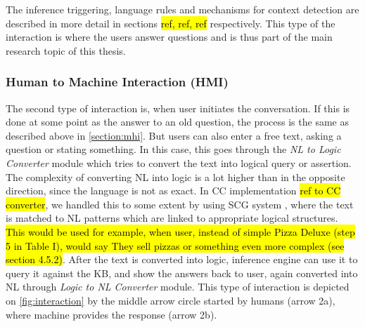 The inference triggering, language rules and mechanisms for context detection
are described in more detail in sections \hl{ref, ref, ref} respectively. This
type of the interaction is where the users answer questions and is thus part of
the main research topic of this thesis.

\subsubsection{Human to Machine Interaction (HMI)}
\label{section:hmi}
The second type of interaction is, when user initiates the conversation. 
If this is done at some point as the answer to an old question, the process is 
the same as described above in \autoref{section:mhi}. But users can also enter a 
free text, asking a question or stating something. In this case, this goes 
through the \emph{NL to Logic Converter} module which tries to convert the
text into logical query or assertion. The complexity of converting NL into logic 
is a lot higher than in the opposite direction, since the language is not
as exact. In CC implementation \hl{ref to CC converter}, we handled this to
some extent by using SCG system \parencite{Schneider2015}, where the text
is matched to NL patterns which are linked to appropriate logical structures.
\hl{This would be used for example, when user, instead of simple Pizza Deluxe 
(step 5 in Table I), would say They sell pizzas or something even more complex 
(see section 4.5.2)}. After the text is converted into logic, inference engine 
can use it to query it against the KB, and show the answers back to user, again 
converted into NL through \emph{Logic to NL Converter} module. This type of
interaction is depicted on \autoref{fig:interaction} by the middle arrow circle
started by humans (arrow 2a), where machine provides the response (arrow 2b).

